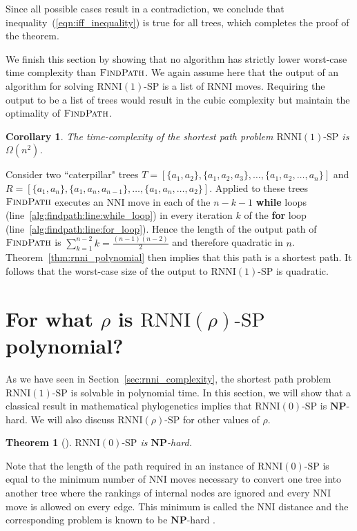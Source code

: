 \documentclass[11pt]{amsart}
\newtheorem{theorem}{Theorem}
\newtheorem{corollary}{Corollary}
\newcommand{\rnni}{\mathrm{RNNI}}
\newcommand{\findpath}{\textsc{FindPath}}
\newcommand{\nni}{\mathrm{NNI}}
\newcommand{\np}{\mathbf{NP}}
\newcommand{\decprob}[1]{\rnni(#1)\text{-}\mathrm{SP}}
\begin{document}
Since all possible cases result in a contradiction, we conclude that inequality~(\ref{eqn:iff_inequality}) is true for all trees, which completes the proof of the theorem.
\endproof

We finish this section by showing that no algorithm has strictly lower worst-case time complexity than $\findpath$.
We again assume here that the output of an algorithm for solving $\decprob{1}$ is a list of $\rnni$ moves.
Requiring the output to be a list of trees would result in the cubic complexity but maintain the optimality of $\findpath$.

\begin{corollary}
The time-complexity of the shortest path problem $\decprob{1}$ is $\Omega(n^2)$.
\end{corollary}

\proof
Consider two ``caterpillar" trees $T = [\{a_1, a_2\}, \{a_1, a_2, a_3\}, \ldots, \{a_1, a_2, \ldots, a_n\}]$ and\\
$R = [\{a_1,a_n\}, \{a_1, a_n, a_{n-1}\}, \ldots, \{a_1, a_n, \ldots, a_2\}]$.
Applied to these trees $\findpath$ executes an $\nni$ move in each of the $n-k-1$ \textbf{while} loops (line~\ref{alg:findpath:line:while_loop}) in every iteration $k$ of the \textbf{for} loop (line~\ref{alg:findpath:line:for_loop}).
Hence the length of the output path of $\findpath$ is $\sum\limits_{k = 1}^{n - 2} k = \frac{(n-1)(n-2)}{2}$ and therefore quadratic in $n$.
Theorem~\ref{thm:rnni_polynomial} then implies that this path is a shortest path.
It follows that the worst-case size of the output to $\decprob{1}$ is quadratic.
\endproof


\section{For what $\rho$ is $\decprob{\rho}$ polynomial?}

As we have seen in Section~\ref{sec:rnni_complexity}, the shortest path problem $\decprob{1}$ is solvable in polynomial time.
In this section, we will show that a classical result in mathematical phylogenetics implies that $\decprob{0}$ is $\np$-hard.
We will also discuss $\decprob{\rho}$ for other values of $\rho$.

\begin{theorem}[\textcite{Dasgupta2000-xa}]
$\decprob{0}$ is $\np$-hard.
\label{thm:nni_hard}
\end{theorem}

\proof
Note that the length of the path required in an instance of $\decprob{0}$ is equal to the minimum number of $\nni$ moves necessary to convert one tree into another tree where the rankings of internal nodes are ignored and every $\nni$ move is allowed on every edge.
This minimum is called the $\nni$ distance and the corresponding problem is known to be $\np$-hard \autocite{Dasgupta2000-xa}.
\endproof
\end{document}
